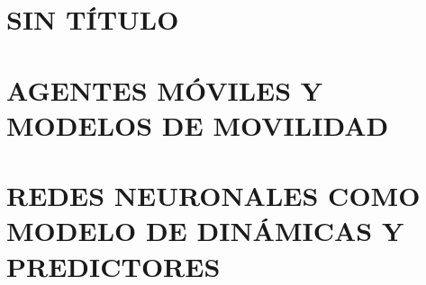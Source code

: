 \documentclass[krantz1,ChapterTOCs]{krantz}
\begin{document}
\part{SIN TÍTULO}


\part{AGENTES MÓVILES Y MODELOS DE MOVILIDAD}


\part{REDES NEURONALES COMO MODELO DE DINÁMICAS Y PREDICTORES}





\printindex
\end{document}
